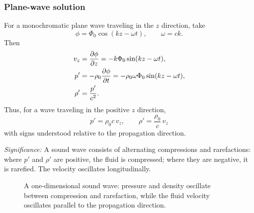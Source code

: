 \documentclass[../main.tex]{subfiles}
\begin{document}
\subsubsection*{Plane-wave solution}
For a monochromatic plane wave traveling in the $z$ direction, take
\begin{equation}
  \phi=\Phi_0\cos(kz-\omega t),\qquad \omega=ck.
  \label{eq:lec22_plane_phi}
\end{equation}
Then
\begin{align}
  v_z&=\pdv{\phi}{z}=-k\Phi_0\sin(kz-\omega t),
  \label{eq:lec22_plane_v}\\
  p'&=-\rho_0\pdv{\phi}{t}=-\rho_0\omega\Phi_0\sin(kz-\omega t),
  \label{eq:lec22_plane_p}\\
  \rho'&=\frac{p'}{c^2}.
  \label{eq:lec22_plane_rho}
\end{align}
Thus, for a wave traveling in the positive $z$ direction,
\begin{equation}
  \boxed{\;p'=\rho_0 c\,v_z,\qquad \rho'=\frac{\rho_0}{c}\,v_z\;}
  \label{eq:lec22_plane_relations}
\end{equation}
with signs understood relative to the propagation direction.

\textit{Significance:} A sound wave consists of alternating compressions and
rarefactions: where $p'$ and $\rho'$ are positive, the fluid is compressed; where
they are negative, it is rarefied. The velocity oscillates longitudinally.

\begin{figure}[h]
\centering
{}
\caption{A one-dimensional sound wave: pressure and density oscillate between
compression and rarefaction, while the fluid velocity oscillates parallel to the
propagation direction.}
\label{fig:lec22_sound_wave}
\end{figure}

\end{document}
